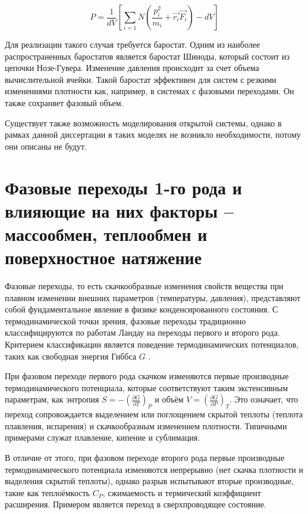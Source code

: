 \begin{equation}
    P = \frac{1}{dV}[\sum_{i=1}{N}(\frac{p_i^2}{m_i} + \vec{r_i} \vec{F_i}) - dV]
\end{equation}

Для реализации такого случая требуется баростат. Одним из наиболее распространенных баростатов является баростат Шиноды, который состоит из цепочки Нозе-Гувера. Изменение давления происходит за счет объема вычислительной ячейки. Такой баростат эффективен для систем с резкими изменениями плотности как, например, в системах с фазовыми переходами. Он также сохраняет фазовый объем.

Существует также возможность моделирования открытой системы, однако в рамках данной диссертации в таких моделях не возникло необходимости, потому они описаны не будут.

\section{Фазовые переходы 1-го рода и влияющие на них факторы – массообмен, теплообмен и поверхностное натяжение}

Фазовые переходы, то есть скачкообразные изменения свойств вещества при плавном изменении внешних параметров (температуры, давления), представляют собой фундаментальное явление в физике конденсированного состояния. С термодинамической точки зрения, фазовые переходы традиционно классифицируются по работам Ландау на переходы первого и второго рода. Критерием классификации является поведение термодинамических потенциалов, таких как свободная энергия Гиббса $G$ .

При фазовом переходе первого рода скачком изменяются первые производные термодинамического потенциала, которые соответствуют таким экстенсивным параметрам, как энтропия  $S = -\left(\frac{\partial G}{\partial T}\right)_P$  и объём  $V = \left(\frac{\partial G}{\partial P}\right)_T$. Это означает, что переход сопровождается выделением или поглощением скрытой теплоты (теплота плавления, испарения) и скачкообразным изменением плотности. Типичными примерами служат плавление, кипение и сублимация.

В отличие от этого, при фазовом переходе второго рода первые производные термодинамического потенциала изменяются непрерывно (нет скачка плотности и выделения скрытой теплоты), однако разрыв испытывают вторые производные, такие как теплоёмкость  $C_P$, сжимаемость и термический коэффициент расширения. Примером является переход в сверхпроводящее состояние.

